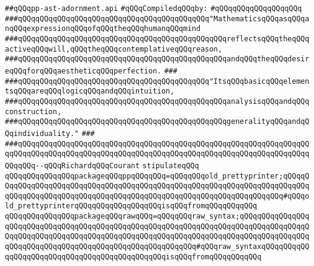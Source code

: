 \label{src/lib/c-kit/src/ast/prettyprint/pp-ast-adornment.api}
\verb|##qQQqpp-ast-adornment.api|\newline
\newline
\verb|#qQQqCompiledqQQqby:|\newline
\verb|#qQQqqQQqqQQqqQQqqQQq|\newline
\newline
\verb|###qQQqqQQqqQQqqQQqqQQqqQQqqQQqqQQqqQQqqQQqqQQq"MathematicsqQQqasqQQqanqQQqexpressionqQQqofqQQqtheqQQqhumanqQQqmind|\newline
\verb|###qQQqqQQqqQQqqQQqqQQqqQQqqQQqqQQqqQQqqQQqqQQqqQQqreflectsqQQqtheqQQqactiveqQQqwill,qQQqtheqQQqcontemplativeqQQqreason,|\newline
\verb|###qQQqqQQqqQQqqQQqqQQqqQQqqQQqqQQqqQQqqQQqqQQqqQQqandqQQqtheqQQqdesireqQQqforqQQqaestheticqQQqperfection.|\newline
\verb|###|\newline
\verb|###qQQqqQQqqQQqqQQqqQQqqQQqqQQqqQQqqQQqqQQqqQQq"ItsqQQqbasicqQQqelementsqQQqareqQQqlogicqQQqandqQQqintuition,|\newline
\verb|###qQQqqQQqqQQqqQQqqQQqqQQqqQQqqQQqqQQqqQQqqQQqqQQqanalysisqQQqandqQQqconstruction,|\newline
\verb|###qQQqqQQqqQQqqQQqqQQqqQQqqQQqqQQqqQQqqQQqqQQqqQQqgeneralityqQQqandqQQqindividuality."|\newline
\verb|###|\newline
\verb|###qQQqqQQqqQQqqQQqqQQqqQQqqQQqqQQqqQQqqQQqqQQqqQQqqQQqqQQqqQQqqQQqqQQqqQQqqQQqqQQqqQQqqQQqqQQqqQQqqQQqqQQqqQQqqQQqqQQqqQQqqQQqqQQqqQQqqQQqqQQqqQQq--qQQqRichardqQQqCourant|\newline
\newline
\newline
\newline
\verb|stipulateqQQq|\newline
\verb|qQQqqQQqqQQqqQQqpackageqQQqppqQQqqQQq=qQQqqQQqold_prettyprinter;qQQqqQQqqQQqqQQqqQQqqQQqqQQqqQQqqQQqqQQqqQQqqQQqqQQqqQQqqQQqqQQqqQQqqQQqqQQqqQQqqQQqqQQqqQQqqQQqqQQqqQQqqQQqqQQqqQQqqQQqqQQqqQQqqQQqqQQqqQQq#qQQqold_prettyprinterqQQqqQQqqQQqqQQqqQQqisqQQqfromqQQqqQQqqQQq|\newline
\verb|qQQqqQQqqQQqqQQqpackageqQQqrawqQQq=qQQqqQQqraw_syntax;qQQqqQQqqQQqqQQqqQQqqQQqqQQqqQQqqQQqqQQqqQQqqQQqqQQqqQQqqQQqqQQqqQQqqQQqqQQqqQQqqQQqqQQqqQQqqQQqqQQqqQQqqQQqqQQqqQQqqQQqqQQqqQQqqQQqqQQqqQQqqQQqqQQqqQQqqQQqqQQqqQQqqQQqqQQqqQQqqQQqqQQqqQQqqQQqqQQqqQQq#qQQqraw_syntaxqQQqqQQqqQQqqQQqqQQqqQQqqQQqqQQqqQQqqQQqqQQqqQQqisqQQqfromqQQqqQQqqQQq|\newline
